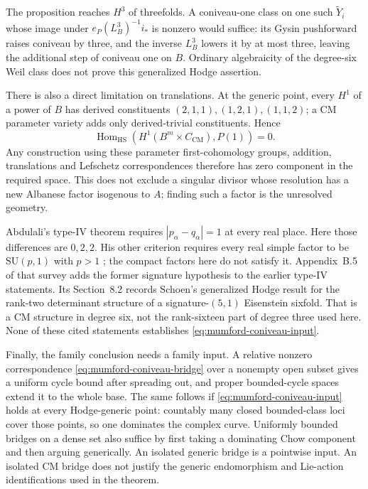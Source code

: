 The proposition reaches $H^3$ of threefolds.  A coniveau-one class
on one such $\widetilde Y_i$ whose image under
$e_P(L_B^3)^{-1}i_*$ is nonzero would suffice: its Gysin
pushforward raises coniveau by three, and the inverse $L_B^3$
lowers it by at most three, leaving the additional step of
coniveau one on $B$.  Ordinary algebraicity of the degree-six
Weil class does not prove this generalized Hodge assertion.

There is also a direct limitation on translations.  At the generic
point, every $H^1$ of a power of $B$ has derived constituents
$(2,1,1),(1,2,1),(1,1,2)$; a CM parameter variety adds only
derived-trivial constituents.  Hence
\[
 \operatorname{Hom}_{\mathrm{HS}}
   (H^1(B^m\times C_{\mathrm{CM}}),P(1))=0.
\]
Any construction using these parameter first-cohomology groups,
addition, translations and Lefschetz correspondences therefore
has zero component in the required space.  This does not exclude
a singular divisor whose resolution has a new Albanese factor
isogenous to $A$; finding such a factor is the unresolved geometry.

Abdulali's type-IV theorem \cite[Theorem~13]{AbdulaliIV} requires
$|p_\alpha-q_\alpha|=1$ at every real place.  Here those differences
are $0,2,2$.  His other criterion requires every real simple factor
to be $\mathrm{SU}(p,1)$ with $p>1$
\cite[Theorems~6.5--6.6]{AbdulaliSurvey}; the compact factors here
do not satisfy it.  Appendix~B.5 of that survey adds the former
signature hypothesis to the earlier type-IV statements.
Its Section~8.2 records Schoen's generalized Hodge result for the
rank-two determinant structure of a signature-$(5,1)$ Eisenstein
sixfold.  That is a CM structure in degree six, not the rank-sixteen
part of degree three used here.  None of these cited statements
establishes \eqref{eq:mumford-coniveau-input}.

Finally, the family conclusion needs a family input.  A relative
nonzero correspondence \eqref{eq:mumford-coniveau-bridge} over a
nonempty open subset gives a uniform cycle bound after spreading
out, and proper bounded-cycle spaces extend it to the whole base.
The same follows if \eqref{eq:mumford-coniveau-input} holds at every
Hodge-generic point: countably many closed bounded-class loci cover
those points, so one dominates the complex curve.  Uniformly
bounded bridges on a dense set also suffice by first taking a
dominating Chow component and then arguing generically.
An isolated generic bridge is a pointwise input.  An isolated CM
bridge does not justify the generic endomorphism and Lie-action
identifications used in the theorem.
